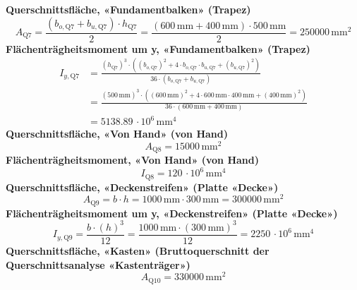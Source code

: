 \documentclass[11pt,a4paper]{article}
\begin{document}
\noindent\textbf{Querschnittsfläche, «Fundamentbalken» (Trapez)}
\begin{equation*}
A_{\text{Q7}} = \frac{\left(b_{o,\text{Q7}} + b_{u,\text{Q7}}\right) \cdot h_{\text{Q7}}}{2} = \frac{\left(600\,\mathrm{mm} + 400\,\mathrm{mm}\right) \cdot 500\,\mathrm{mm}}{2} = 250000\,\mathrm{mm}^{2}
\end{equation*}
\noindent\textbf{Flächenträgheitsmoment um y, «Fundamentbalken» (Trapez)}
\begin{equation*}
\begin{aligned}
  I_{y,\text{Q7}} &= \frac{\left(h_{\text{Q7}}\right)^{3} \cdot \left(\left(b_{o,\text{Q7}}\right)^{2} + 4 \cdot b_{o,\text{Q7}} \cdot b_{u,\text{Q7}} + \left(b_{u,\text{Q7}}\right)^{2}\right)}{36 \cdot \left(b_{o,\text{Q7}} + b_{u,\text{Q7}}\right)} \\
  &= \frac{\left(500\,\mathrm{mm}\right)^{3} \cdot \left(\left(600\,\mathrm{mm}\right)^{2} + 4 \cdot 600\,\mathrm{mm} \cdot 400\,\mathrm{mm} + \left(400\,\mathrm{mm}\right)^{2}\right)}{36 \cdot \left(600\,\mathrm{mm} + 400\,\mathrm{mm}\right)} \\
  &= 5138.89\,\cdot 10^{6}\,\mathrm{mm}^{4}
\end{aligned}
\end{equation*}
\noindent\textbf{Querschnittsfläche, «Von Hand» (von Hand)}
\begin{equation*}
A_{\text{Q8}} = 15000\,\mathrm{mm}^{2}
\end{equation*}
\noindent\textbf{Flächenträgheitsmoment, «Von Hand» (von Hand)}
\begin{equation*}
I_{\text{Q8}} = 120\,\cdot 10^{6}\,\mathrm{mm}^{4}
\end{equation*}
\noindent\textbf{Querschnittsfläche, «Deckenstreifen» (Platte «Decke»)}
\begin{equation*}
A_{\text{Q9}} = b \cdot h = 1000\,\mathrm{mm} \cdot 300\,\mathrm{mm} = 300000\,\mathrm{mm}^{2}
\end{equation*}
\noindent\textbf{Flächenträgheitsmoment um y, «Deckenstreifen» (Platte «Decke»)}
\begin{equation*}
I_{y,\text{Q9}} = \frac{b \cdot \left(h\right)^{3}}{12} = \frac{1000\,\mathrm{mm} \cdot \left(300\,\mathrm{mm}\right)^{3}}{12} = 2250\,\cdot 10^{6}\,\mathrm{mm}^{4}
\end{equation*}
\noindent\textbf{Querschnittsfläche, «Kasten» (Bruttoquerschnitt der Querschnittsanalyse «Kastenträger»)}
\begin{equation*}
A_{\text{Q10}} = 330000\,\mathrm{mm}^{2}
\end{equation*}
\end{document}

